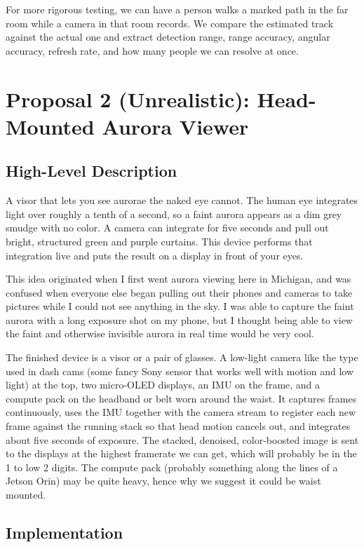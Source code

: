 \documentclass[11pt]{article}
\begin{document}
For more rigorous testing, we can have a person walks a marked path in the far room while a camera in that room records. We compare the estimated track against the actual one and extract detection range, range accuracy, angular accuracy, refresh rate, and how many people we can resolve at once.

\newpage

\section*{Proposal 2 (Unrealistic): Head-Mounted Aurora Viewer}

\subsection*{High-Level Description}

A visor that lets you see aurorae the naked eye cannot. The human eye integrates light over roughly a tenth of a second, so a faint aurora appears as a dim grey smudge with no color. A camera can integrate for five seconds and pull out bright, structured green and purple curtains. This device performs that integration live and puts the result on a display in front of your eyes.

This idea originated when I first went aurora viewing here in Michigan, and was confused when everyone else began pulling out their phones and cameras to take pictures while I could not see anything in the sky. I was able to capture the faint aurora with a long exposure shot on my phone, but I thought being able to view the faint and otherwise invisible aurora in real time would be very cool.

The finished device is a visor or a pair of glasses. A low-light camera like the type used in dash cams (some fancy Sony sensor that works well with motion and low light) at the top, two micro-OLED displays, an IMU on the frame, and a compute pack on the headband or belt worn around the waist. It captures frames continuously, uses the IMU together with the camera stream to register each new frame against the running stack so that head motion cancels out, and integrates about five seconds of exposure. The stacked, denoised, color-boosted image is sent to the displays at the highest framerate we can get, which will probably be in the 1 to low 2 digits. The compute pack (probably something along the lines of a Jetson Orin) may be quite heavy, hence why we suggest it could be waist mounted. 

\subsection*{Implementation}
\end{document}
